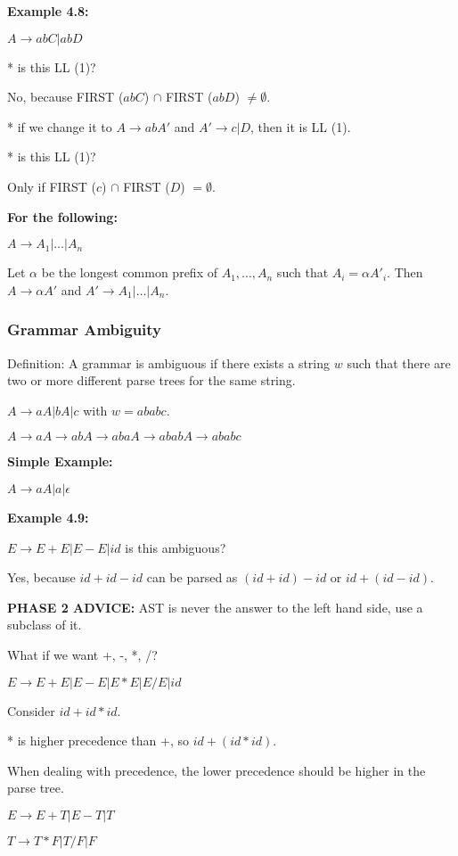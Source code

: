 \documentclass[twocolumn]{article}
\begin{document}
\textbf{Example 4.8:}

$A \to abC | abD$

* is this LL (1)? 

No, because FIRST ($abC$) $\cap$ FIRST ($abD$) $\neq \emptyset$.

* if we change it to $A \to abA'$ and $A' \to c | D$, then it is LL (1).

* is this LL (1)? 

Only if FIRST ($c$) $\cap$ FIRST ($D$) $= \emptyset$.

\textbf{For the following:}

$A \to A _1 | \dots | A _n$

Let $\alpha$ be the longest common prefix of $A _1, \dots, A _n$ such that $A _i = \alpha A' _i$. 
Then $A \to \alpha A'$ and $A' \to A _1 | \dots | A _n$.

\subsubsection{Grammar Ambiguity}

Definition: A grammar is ambiguous if there exists a string $w$ such that there are two or more different parse trees for the same string.

$A \to aA | bA | c$ with $w = ababc$.

$A \to aA \to abA \to abaA \to ababA \to ababc$

\textbf{Simple Example:}

$A \to aA | a | \mathcal{\epsilon}$

\textbf{Example 4.9:}

$E \to E + E | E - E | id$ is this ambiguous?

Yes, because $id + id - id$ can be parsed as $(id + id) - id$ or $id + (id - id)$.

\newpage

\textbf{PHASE 2 ADVICE:} AST is never the answer to the left hand side, use a subclass of it.

What if we want +, -, *, /?

$E \to E + E | E - E | E * E | E / E | id$

Consider $id + id * id$.

* is higher precedence than +, so $id + (id * id)$.

When dealing with precedence, the lower precedence should be higher in the parse tree.

$E \to E + T | E - T | T$

$T \to T * F | T / F | F$
\end{document}
